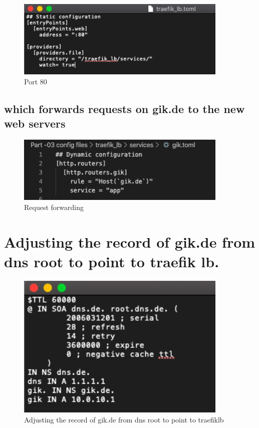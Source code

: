 \begin{figure}[H]
\centering
  \includegraphics[width=0.9\textwidth]{Images/listen on port 80 and use a file provider,.png}
  \caption{Port 80}
  \label{fig:3.10}
\end{figure}

\subsection{which forwards requests on gik.de to the new web servers}

\begin{figure}[H]
\centering
  \includegraphics[width=0.9\textwidth]{Images/Request forwording.png}
  \caption{Request forwarding}
  \label{fig:3.11}
\end{figure}

\section{Adjusting the record of gik.de from dns root to point to traefik lb.}

\begin{figure}[H]
\centering
  \includegraphics[width=0.9\textwidth]{Images/Adjusting a recored 3.3.png}
  \caption{Adjusting the record of gik.de from dns root to point to traefik\textunderscore lb}
  \label{fig:3.12}
\end{figure}

